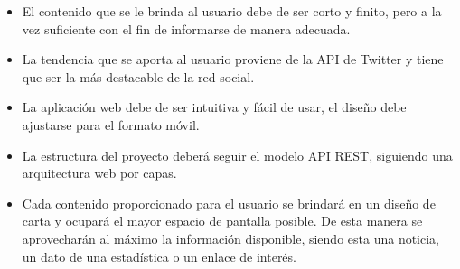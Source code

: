 \begin{itemize}
\item El contenido que se le brinda al usuario debe de ser corto y finito, pero a la vez suficiente con el fin de informarse de manera adecuada.
\item La tendencia que se aporta al usuario proviene de la API de Twitter y tiene que ser la más destacable de la red social.
\item La aplicación web debe de ser intuitiva y fácil de usar, el diseño debe ajustarse para el formato móvil.
\item La estructura del proyecto deberá seguir el modelo API REST, siguiendo una arquitectura web por capas.
\item Cada contenido proporcionado para el usuario se brindará en un diseño de carta y ocupará el mayor espacio de pantalla posible. De esta manera se aprovecharán al máximo la información disponible, siendo esta una noticia, un dato de una estadística o un enlace de interés.
\end{itemize}

\newpage



